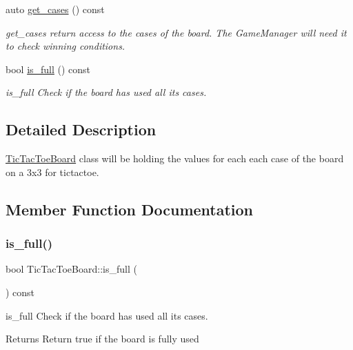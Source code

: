 \begin{DoxyCompactItemize}
\mbox{\label{class_tic_tac_toe_board_aecc770d5451f2e3233da05859f6f37d4}} 
auto \hyperlink{class_tic_tac_toe_board_aecc770d5451f2e3233da05859f6f37d4}{get\+\_\+cases} () const
\begin{DoxyCompactList}\small\item\em get\+\_\+cases return access to the cases of the board. The Game\+Manager will need it to check winning conditions. \end{DoxyCompactList}\item 
bool \hyperlink{class_tic_tac_toe_board_a4d5be55d8439e66d32039ba98551fda7}{is\+\_\+full} () const
\begin{DoxyCompactList}\small\item\em is\+\_\+full Check if the board has used all its cases. \end{DoxyCompactList}\end{DoxyCompactItemize}


\subsection{Detailed Description}
\hyperlink{class_tic_tac_toe_board}{Tic\+Tac\+Toe\+Board} class will be holding the values for each each case of the board on a 3x3 for tictactoe. 

\subsection{Member Function Documentation}
\mbox{\label{class_tic_tac_toe_board_a4d5be55d8439e66d32039ba98551fda7}} 
\subsubsection{\texorpdfstring{is\+\_\+full()}{is\_full()}}
{\footnotesize\ttfamily bool Tic\+Tac\+Toe\+Board\+::is\+\_\+full (\begin{DoxyParamCaption}{ }\end{DoxyParamCaption}) const\hspace{0.3cm}{\ttfamily [inline]}}



is\+\_\+full Check if the board has used all its cases. 

\begin{DoxyReturn}{Returns}
Return true if the board is fully used 
\end{DoxyReturn}
\mbox{\label{class_tic_tac_toe_board_a59fbbb4e8c7fa5ba6e1cdc8c33c50fb5}} 

